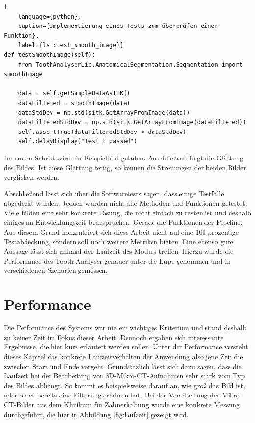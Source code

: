 \begin{lstlisting}[
    language={python},
    caption={Implementierung eines Tests zum überprüfen einer Funktion},
    label={lst:test_smooth_image}]
def testSmoothImage(self):
    from ToothAnalyserLib.AnatomicalSegmentation.Segmentation import smoothImage
   
    data = self.getSampleDataAsITK()
    dataFiltered = smoothImage(data)
    dataStdDev = np.std(sitk.GetArrayFromImage(data))
    dataFilteredStdDev = np.std(sitk.GetArrayFromImage(dataFiltered))
    self.assertTrue(dataFilteredStdDev < dataStdDev)
    self.delayDisplay("Test 1 passed")
\end{lstlisting}

Im ersten Schritt wird ein Beispielbild geladen. Anschließend folgt die Glättung
des Bildes. Ist diese Glättung fertig, so können die Streuungen der beiden
Bilder verglichen werden.

Abschließend lässt sich über die Softwaretests sagen, dass einige Testfälle abgedeckt
wurden. Jedoch wurden nicht alle Methoden und Funktionen getestet. Viele bilden eine
sehr konkrete Lösung, die nicht einfach zu testen ist und deshalb einiges an
Entwicklungszeit beanspruchen. Gerade die Funktionen der Pipeline. Aus diesem
Grund konzentriert sich diese Arbeit nicht auf eine 100 prozentige Testabdeckung,
sondern soll noch weitere Metriken bieten. Eine ebenso gute Aussage lässt sich
anhand der Laufzeit des Moduls treffen. Hierzu wurde die Performance des Tooth Analyser
genauer unter die Lupe genommen und in verschiedenen Szenarien gemessen.

\pagebreak

\section{Performance}
Die Performance des Systems war nie ein wichtiges Kriterium und stand deshalb zu
keiner Zeit im Fokus dieser Arbeit. Dennoch ergaben sich interessante Ergebnisse,
die hier kurz erläutert werden sollen. Unter der Performance versteht dieses Kapitel
das konkrete Laufzeitverhalten der Anwendung also jene Zeit die zwischen Start und
Ende vergeht. Grundsätzlich lässt sich dazu sagen, dass die Laufzeit bei der Bearbeitung
von \ac{3D}-Mikro-\ac{CT}-Aufnahmen sehr stark vom Typ des Bildes abhängt. So
kommt es beispielsweise darauf an, wie groß das Bild ist, oder ob es bereits
eine Filterung erfahren hat. Bei der Verarbeitung der Mikro-\ac{CT}-Bilder aus
dem Klinikum für Zahnerhaltung wurde eine konkrete Messung durchgeführt, die hier
in Abbildung \ref{fig:laufzeit} gezeigt wird.

